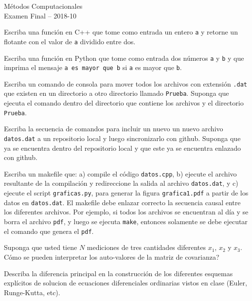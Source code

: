 \documentclass[11pt,letterpaper]{exam}
\begin{document}
\begin{center}
{\Large Métodos Computacionales} \\
Examen Final -- 2018-10 \\
\end{center}

\begin{questions}
Escriba una funci\'on en C++ que tome
como entrada un entero \verb"a" y retorne un flotante con el valor de \verb"a" dividido entre dos.


Escriba una funci\'on en Python que tome
como entrada dos n\'umeros \verb"a" y \verb"b" y que 
imprima el mensaje \verb"a es mayor que b" si \verb"a" es mayor que \verb"b".


Escriba un comando de consola para mover todos los archivos con extensi\'on
\verb".dat" que existen en un directorio a otro directorio llamado
\verb"Prueba". 
Suponga que ejecuta el
comando dentro del directorio que contiene los archivos y el
directorio \verb"Prueba".


Escriba la secuencia de comandos para incluir un nuevo 
un nuevo  archivo \verb"datos.dat" a un repositorio local y luego sincronizarlo con github.
Suponga que ya se encuentra dentro del repositorio local y que este ya se encuentra
enlazado con github.


Escriba un makefile que: a) compile el c\'odigo \verb"datos.cpp", b) ejecute 
el archivo resultante de la compilaci\'on y redireccione 
la salida  al archivo \verb"datos.dat", y c) ejecute el script \verb"graficas.py", 
para generar la figura  \verb"grafica1.pdf" a partir de los datos en \verb"datos.dat". 
El makefile debe enlazar correcto la secuencia causal entre los diferentes archivos. 
Por ejemplo, si todos los archivos se encuentran al d\'ia y se borra
el archivo \verb"pdf", y luego se ejecuta \verb"make", entonces
solamente se debe ejecutar el comando que genera el \verb"pdf". 


Suponga que usted tiene $N$ mediciones de tres cantidades diferentes $x_1$, $x_2$ y
$x_3$. C\'omo se pueden interpretar los auto-valores de la matriz de
covarianza?


Describa la diferencia principal en la construcción de los diferentes
esquemas expl\'icitos de solucion de ecuaciones diferenciales
ordinarias vistos en clase (Euler, Runge-Kutta, etc).



\end{questions}
\end{document}
